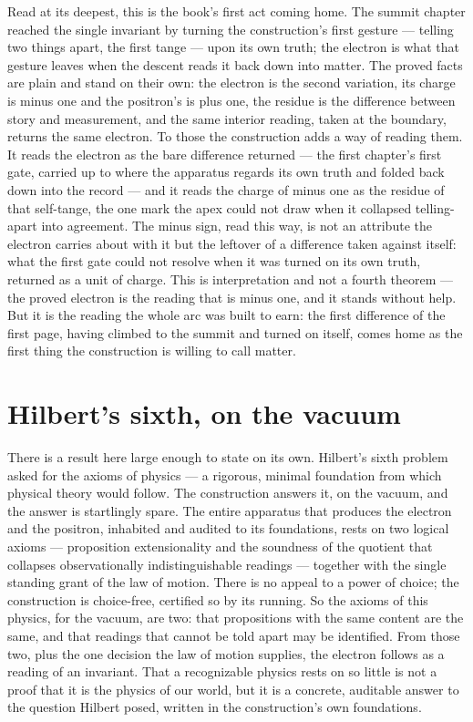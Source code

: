 Read at its deepest, this is the book's first act coming home. The summit chapter reached the single
invariant by turning the construction's first gesture --- telling two things apart, the first tange ---
upon its own truth; the electron is what that gesture leaves when the descent reads it back down into
matter. The proved facts are plain and stand on their own: the electron is the second variation, its
charge is minus one and the positron's is plus one, the residue is the difference between story and
measurement, and the same interior reading, taken at the boundary, returns the same electron. To those
the construction adds a way of reading them. It reads the electron as the bare difference returned ---
the first chapter's first gate, carried up to where the apparatus regards its own truth and folded back
down into the record --- and it reads the charge of minus one as the residue of that self-tange, the one
mark the apex could not draw when it collapsed telling-apart into agreement. The minus sign, read this
way, is not an attribute the electron carries about with it but the leftover of a difference taken
against itself: what the first gate could not resolve when it was turned on its own truth, returned as a
unit of charge. This is interpretation and not a fourth theorem --- the proved electron is the reading
that is minus one, and it stands without help. But it is the reading the whole arc was built to earn: the
first difference of the first page, having climbed to the summit and turned on itself, comes home as the
first thing the construction is willing to call matter.

\section{Hilbert's sixth, on the vacuum}
\label{se:hilberts-sixth-on-the-vacuum}

There is a result here large enough to state on its own. Hilbert's sixth problem asked for the axioms
of physics --- a rigorous, minimal foundation from which physical theory would follow. The construction
answers it, on the vacuum, and the answer is startlingly spare. The entire apparatus that produces the
electron and the positron, inhabited and audited to its foundations, rests on two logical axioms ---
proposition extensionality and the soundness of the quotient that collapses observationally
indistinguishable readings --- together with the single standing grant of the law of motion. There is
no appeal to a power of choice; the construction is choice-free, certified so by its running. So the
axioms of this physics, for the vacuum, are two: that propositions with the same content are the same,
and that readings that cannot be told apart may be identified. From those two, plus the one decision
the law of motion supplies, the electron follows as a reading of an invariant. That a recognizable
physics rests on so little is not a proof that it is the physics of our world, but it is a concrete,
auditable answer to the question Hilbert posed, written in the construction's own foundations.

